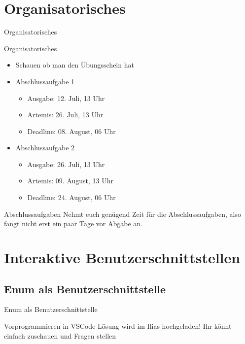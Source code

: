 \documentclass[aspectratio=169]{beamer}
\begin{document}
\section{Organisatorisches}
\begin{frame}[fragile]{Organisatorisches}
  \begin{alertblock}{Organisatorisches}
    \begin{itemize}
      \item Schauen ob man den Übungsschein hat
      \item Abschlussaufgabe 1 \begin{itemize}
        \item \color{nicegreen}Ausgabe: \color{FGround} 12. Juli, 13 Uhr
        \item \color{numbercolor} Artemis: \color{FGround} 26. Juli, 13 Uhr
        \item \color{alertcolor}Deadline: \color{FGround} 08. August, 06 Uhr
      \end{itemize}
      \item Abschlussaufgabe 2 \begin{itemize}
        \item \color{nicegreen}Ausgabe: \color{FGround} 26. Juli, 13 Uhr
        \item \color{numbercolor} Artemis: \color{FGround} 09. August, 13 Uhr
        \item \color{alertcolor}Deadline: \color{FGround} 24. August, 06 Uhr
      \end{itemize}
    \end{itemize}
  \end{alertblock}
  \begin{block}{Abschlussaufgaben}
    Nehmt euch genügend Zeit für die Abschlussaufgaben, also fangt nicht erst ein paar Tage vor Abgabe an.
  \end{block}
\end{frame}

\section{Interaktive Benutzerschnittstellen}
\subsection{Enum als Benutzerschnittstelle}
\begin{frame}{Enum als Benutzerschnittstelle}
  \begin{block}{Vorprogrammieren in VSCode}
    Lösung wird im Ilias hochgeladen! Ihr könnt einfach zuschauen und Fragen stellen
  \end{block}
\end{frame}
\end{document}
